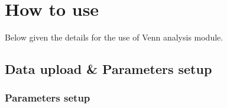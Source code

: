\documentclass[
  a4paper,
  oneside,
  open=any]{scrreport}
\begin{document}
\hypertarget{how-to-use-6}{%
\section{How to use}\label{how-to-use-6}}

Below given the details for the use of Venn analysis module.

\hypertarget{data-upload-parameters-setup-2}{%
\subsection{Data upload \& Parameters
setup}\label{data-upload-parameters-setup-2}}

\hypertarget{parameters-setup-2}{%
\subsubsection{Parameters setup}\label{parameters-setup-2}}
\end{document}
